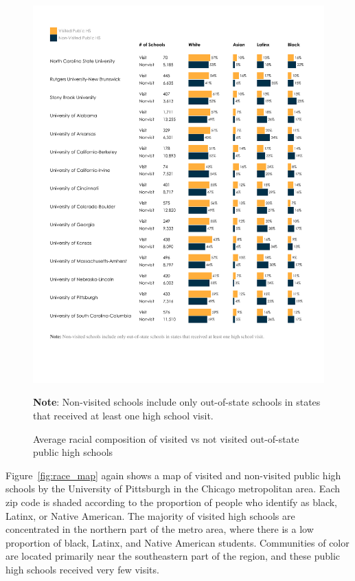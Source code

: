 \documentclass{article}
\begin{document}
\begin{figure}[!ht]
    \centering
    \includegraphics[width=\textwidth, trim={1.25cm, 4cm, 1cm, 1.5cm}, clip]{assets/graphs/race_graph_pub_out.pdf}
    \begin{flushleft}\textbf{Note}: Non-visited schools include only out-of-state schools in states that received at least one high school visit.\end{flushleft}
    \caption{Average racial composition of visited vs not visited out-of-state public high schools}
    \label{fig:race_graph_pub_out}
\end{figure}

Figure~\ref{fig:race_map} again shows a map of visited and non-visited public high schools by the University of Pittsburgh in the Chicago metropolitan area. Each zip code is shaded according to the proportion of people who identify as black, Latinx, or Native American. The majority of visited high schools are concentrated in the northern part of the metro area, where there is a low proportion of black, Latinx, and Native American students. Communities of color are located primarily near the southeastern part of the region, and these public high schools received very few visits.
\end{document}
